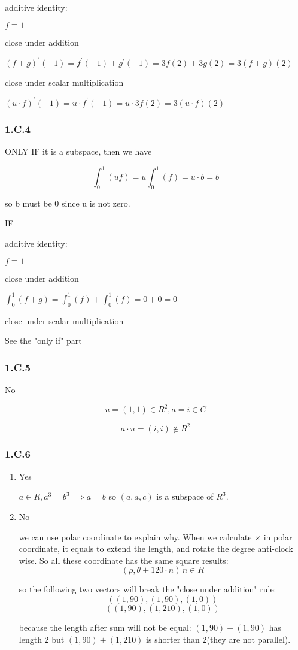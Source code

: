additive identity:

$ f \equiv 1$

close under addition

$(f+g)^{'} (-1) = f^{'} (-1) + g^{'} (-1) = 3f(2) + 3g(2) = 3(f+g)(2) $

close under scalar multiplication

$(u\cdot f)^{'}(-1) = u\cdot f^{'}(-1) = u\cdot 3f(2) = 3(u\cdot f)(2)$

\subsubsection*{1.C.4}

ONLY IF it is a subspace, then we have

\[ \int_{0}^{1}(uf) = u\int_{0}^{1}(f) = u\cdot b = b \]

so b must be 0 since u is not zero.


IF

additive identity:

$ f \equiv 1$

close under addition

$\int_{0}^{1}(f+g) = \int_{0}^{1}(f) +  \int_{0}^{1}(f) = 0 + 0 = 0 $

close under scalar multiplication

See the "only if" part

\subsubsection*{1.C.5}

No

\[ u = (1, 1) \in R^{2}, a= i \in C \]


\[ a\cdot u = (i, i) \notin R^{2} \]

\subsubsection*{1.C.6}

\begin{enumerate}[label=(\alph*)]
\item Yes

$a\in R, a^{3}=b^{3} \implies a = b $ so $(a, a, c)$ is a subspace of $R^{3}$.
\item No

we can use polar coordinate to explain why. When we calculate $\times$ in polar coordinate, it equals to extend the length, and rotate the degree anti-clock wise. So all these coordinate has the same square results:
\[(\rho, \theta + 120\cdot n) \,n \in R\]

so the following two vectors will break the "close under addition" rule:
\[((1, 90), (1, 90), (1, 0))\]
\[((1, 90), (1, 210), (1, 0))\]

because the length after sum will not be equal:  $(1, 90) + (1, 90)$ has length 2 but $(1, 90) + (1, 210)$ is shorter than 2(they are not parallel).
\end{enumerate}


